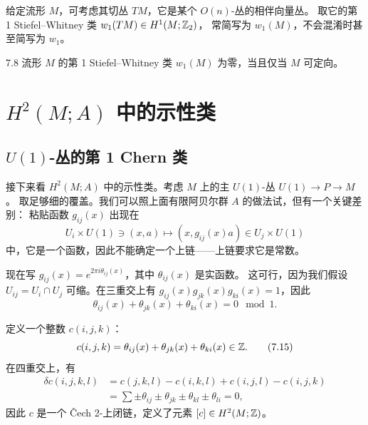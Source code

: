 给定流形 $M$，可考虑其切丛 $TM$，它是某个 $O(n)$-丛的相伴向量丛。
取它的第 1 Stiefel--Whitney 类 $w_1(TM)\in H^1(M;\mathbb{Z}_2)$，
常简写为 $w_1(M)$，不会混淆时甚至简写为 $w_1$。

\begin{proposition}{7.8}
流形 $M$ 的第 1 Stiefel--Whitney 类 $w_1(M)$ 为零，当且仅当 $M$ 可定向。
\end{proposition}


\section{$H^2(M;A)$ 中的示性类}

\subsection{$U(1)$-丛的第 1 Chern 类}

接下来看 $H^2(M;A)$ 中的示性类。考虑 $M$ 上的主 $U(1)$-丛 $U(1)\to P\to M$。
取足够细的覆盖。我们可以照上面有限阿贝尔群 $A$ 的做法试，但有一个关键差别：
粘贴函数 $g_{ij}(x)$ 出现在
\begin{equation}
U_i\times U(1)\ni(x,a)\mapsto(x,g_{ij}(x)a)\in U_j\times U(1)
\tag{7.13}
\end{equation}
中，它是一个函数，因此不能确定一个上链——上链要求它是常数。

现在写 $g_{ij}(x)=e^{2\pi i\theta_{ij}(x)}$，其中 $\theta_{ij}(x)$ 是实函数。
这可行，因为我们假设 $U_{ij}=U_i\cap U_j$ 可缩。在三重交上有
$g_{ij}(x)g_{jk}(x)g_{ki}(x)=1$，因此
\begin{equation}
\theta_{ij}(x)+\theta_{jk}(x)+\theta_{ki}(x)=0\mod 1.
\tag{7.14}
\end{equation}

定义一个整数 $c(i,j,k)$：
\begin{equation}
c(i,j,k)=\theta_{ij}(x)+\theta_{jk}(x)+\theta_{ki}(x)\in\mathbb{Z}.
\tag{7.15}
\end{equation}
在四重交上，有
\begin{equation}
\begin{split}
\delta c(i,j,k,l)&=c(j,k,l)-c(i,k,l)+c(i,j,l)-c(i,j,k)\\
&=\textstyle\sum\pm\theta_{ij}\pm\theta_{jk}\pm\theta_{kl}\pm\theta_{li}=0,
\end{split}
\tag{7.16}
\end{equation}
因此 $c$ 是一个 Čech 2-上闭链，定义了元素 $[c]\in H^2(M;\mathbb{Z})$。

